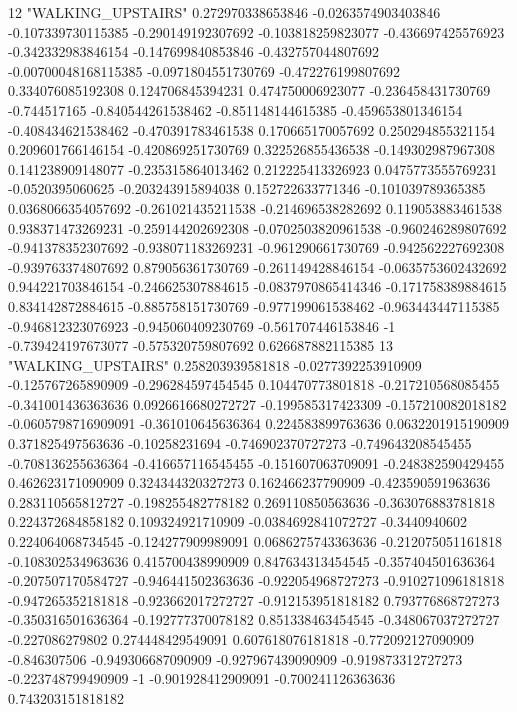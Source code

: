12 "WALKING_UPSTAIRS" 0.272970338653846 -0.0263574903403846 -0.107339730115385 -0.290149192307692 -0.103818259823077 -0.436697425576923 -0.342332983846154 -0.147699840853846 -0.432757044807692 -0.00700048168115385 -0.0971804551730769 -0.472276199807692 0.334076085192308 0.124706845394231 0.474750006923077 -0.236458431730769 -0.744517165 -0.840544261538462 -0.851148144615385 -0.459653801346154 -0.408434621538462 -0.470391783461538 0.170665170057692 0.250294855321154 0.209601766146154 -0.420869251730769 0.322526855436538 -0.149302987967308 0.141238909148077 -0.235315864013462 0.212225413326923 0.0475773555769231 -0.0520395060625 -0.203243915894038 0.152722633771346 -0.101039789365385 0.0368066354057692 -0.261021435211538 -0.214696538282692 0.119053883461538 0.938371473269231 -0.259144202692308 -0.0702503820961538 -0.960246289807692 -0.941378352307692 -0.938071183269231 -0.961290661730769 -0.942562227692308 -0.939763374807692 0.879056361730769 -0.261149428846154 -0.0635753602432692 0.944221703846154 -0.246625307884615 -0.0837970865414346 -0.171758389884615 0.834142872884615 -0.885758151730769 -0.977199061538462 -0.963443447115385 -0.946812323076923 -0.945060409230769 -0.561707446153846 -1 -0.739424197673077 -0.575320759807692 0.626687882115385
13 "WALKING_UPSTAIRS" 0.258203939581818 -0.0277392253910909 -0.125767265890909 -0.296284597454545 0.104470773801818 -0.217210568085455 -0.341001436363636 0.0926616680272727 -0.199585317423309 -0.157210082018182 -0.0605798716909091 -0.361010645636364 0.224583899763636 0.0632201915190909 0.371825497563636 -0.10258231694 -0.746902370727273 -0.749643208545455 -0.708136255636364 -0.416657116545455 -0.151607063709091 -0.248382590429455 0.462623171090909 0.324344320327273 0.162466237790909 -0.423590591963636 0.283110565812727 -0.198255482778182 0.269110850563636 -0.363076883781818 0.224372684858182 0.109324921710909 -0.0384692841072727 -0.3440940602 0.224064068734545 -0.124277909989091 0.0686275743363636 -0.212075051161818 -0.108302534963636 0.415700438990909 0.847634313454545 -0.357404501636364 -0.207507170584727 -0.946441502363636 -0.922054968727273 -0.910271096181818 -0.947265352181818 -0.923662017272727 -0.912153951818182 0.793776868727273 -0.350316501636364 -0.192777370078182 0.851338463454545 -0.348067037272727 -0.227086279802 0.274448429549091 0.607618076181818 -0.772092127090909 -0.846307506 -0.949306687090909 -0.927967439090909 -0.919873312727273 -0.223748799490909 -1 -0.901928412909091 -0.700241126363636 0.743203151818182

